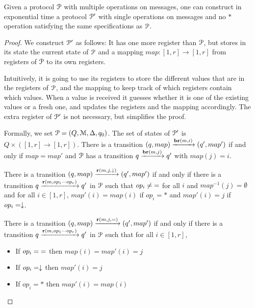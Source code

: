 \begin{lemma}
	\label{lem:nostar-oneop}
	Given a protocol $\mathcal{P}$ with multiple operations on messages, one can construct in exponential time a protocol $\mathcal{P}'$ with single operations on messages and no $*$ operation satisfying the same specifications as $\mathcal{P}$.
\end{lemma}

\begin{proof}
	We construct $\mathcal{P}'$ as follows: It has one more register than $\mathcal{P}$, but stores in its state the current state of $\mathcal{P}$ and a mapping $map : [1,r] \to [1,r]$ from registers of $\mathcal{P}$ to its own registers.
	
	Intuitively, it is going to use its registers to store the different values that are in the registers of $\mathcal{P}$, and the mapping to keep track of which registers contain which values.
	When a value is received it guesses whether it is one of the existing values or a fresh one, and updates the registers and the mapping accordingly.
	The extra register of $\mathcal{P}'$ is not necessary, but simplifies the proof.
	
	Formally, we set $\mathcal{P} = (Q, \mathcal{M}, \Delta, q_0)$. The set of states of $\mathcal{P}'$ is $Q \times ([1,r] \to [1,r])$. 
	There is a transition $(q, map) \xrightarrow{\textbf{br}(m, i)} (q', map')$ if and only if $map = map'$ and $\mathcal{P}$ has a transition $q \xrightarrow{\textbf{br}(m, j)} q'$ with $map(j) = i$.
	
	There is a transition $(q, map) \xrightarrow{\textbf{r}(m, j, \downarrow)} (q', map')$ if and only if there is a transition $q \xrightarrow{\textbf{r}(m, op_1\cdots op_r)} q'$ in $\mathcal{P}$ such that $op_i \neq {=}$ for all $i$ and $map^{-1}(j) =\emptyset$ and for all $i \in [1,r]$, $map'(i) = map(i)$ if $op_i = *$ and $map'(i) = j$ if $op_i = \downarrow$.
	
	There is a transition $(q, map) \xrightarrow{\textbf{r}(m, j, {=})} (q', map')$ if and only if there is a transition $q \xrightarrow{\textbf{r}(m, op_1\cdots op_r)} q'$ in $\mathcal{P}$ such that for all $i\in [1,r]$,
	\begin{itemize}
		\item If $op_i = {=}$ then $map(i) = map'(i) = j$
		
		\item If $op_i = \downarrow$ then $map'(i) = j$
		
		\item If $op_i = *$ then $map'(i)= map(i)$
	\end{itemize}


\end{proof}

